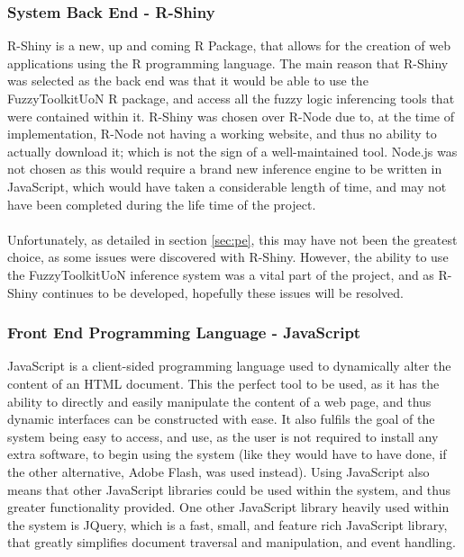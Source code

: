 \tocless\subsubsection{System Back End - R-Shiny}
R-Shiny is a new, up and coming R Package, that allows for the creation of web applications using the R programming language. The main reason that R-Shiny was selected as the back end was that it would be able to use the FuzzyToolkitUoN R package, and access all the fuzzy logic inferencing tools that were contained within it. R-Shiny was chosen over R-Node due to, at the time of implementation, R-Node not having a working website, and thus no ability to actually download it; which is not the sign of a well-maintained tool. Node.js was not chosen as this would require a brand new inference engine to be written in JavaScript, which would have taken a considerable length of time, and may not have been completed during the life time of the project.\ \\
\ \\
Unfortunately, as detailed in section \ref{sec:pe}, this may have not been the greatest choice, as some issues were discovered with R-Shiny. However, the ability to use the FuzzyToolkitUoN inference system was a vital part of the project, and as R-Shiny continues to be developed, hopefully these issues will be resolved.

\tocless\subsubsection{Front End Programming Language - JavaScript}
JavaScript is a client-sided programming language used to dynamically alter the content of an HTML document. This the perfect tool to be used, as it has the ability to directly and easily manipulate the content of a web page, and thus dynamic interfaces can be constructed with ease. It also fulfils the goal of the system being easy to access, and use, as the user is not required to install any extra software, to begin using the system (like they would have to have done, if the other alternative, Adobe Flash, was used instead). Using JavaScript also means that other JavaScript libraries could be used within the system, and thus greater functionality provided. One other JavaScript library heavily used within the system is JQuery, which is a fast, small, and feature rich JavaScript library, that greatly simplifies document traversal and manipulation, and event handling.

